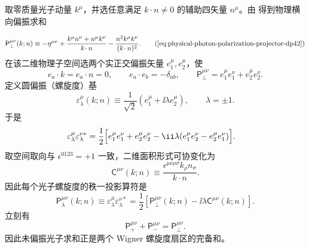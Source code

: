 \begin{derivation}
取零质量光子动量 $k^\mu$，并选任意满足 $k\!\cdot n\neq0$ 的辅助四矢量 $n^\mu$。由 得到物理横向偏振求和

\begin{equation*}
 \mathsf P_\perp^{\mu\nu}(k;n)
 \equiv
 -\eta^{\mu\nu}
 +\frac{k^\mu n^\nu+n^\mu k^\nu}{k\!\cdot n}
 -\frac{n^2k^\mu k^\nu}{(k\!\cdot n)^2}.
 \tag{\cref{eq:physical-photon-polarization-projector-dp42}}
\end{equation*}
在该二维物理子空间选两个实正交偏振矢量 $e_1^\mu,e_2^\mu$，使
\begin{equation*}
 e_a\!\cdot k=e_a\!\cdot n=0,
 \qquad
 e_a\!\cdot e_b=-\delta_{ab},
 \qquad
 \mathsf P_\perp^{\mu\nu}=e_1^\mu e_1^\nu+e_2^\mu e_2^\nu.
\end{equation*}
定义圆偏振（螺旋度）基
\begin{equation*}
 \varepsilon_\lambda^\mu(k;n)
 \equiv\frac1{\sqrt2}
 \left(e_1^\mu+\ii\lambda e_2^\mu\right),
 \qquad \lambda=\pm1.
 \end{equation*}
于是
\begin{align*}
 \varepsilon_\lambda^\mu\varepsilon_\lambda^{\nu *}
 &=\frac12\Bigl[
 e_1^\mu e_1^\nu+e_2^\mu e_2^\nu
 -\ii\lambda(e_1^\mu e_2^\nu-e_2^\mu e_1^\nu)
 \Bigr].
 \end{align*}
取空间取向与 $\epsilon^{0123}=+1$ 一致，二维面积形式可协变化为
\begin{equation*}
 \mathsf C^{\mu\nu}(k;n)
 \equiv
 \frac{\epsilon^{\mu\nu\rho\sigma}k_\rho n_\sigma}
 {k\!\cdot n}.
 \end{equation*}
因此每个光子螺旋度的秩一投影算符是
\begin{equation*}
 {
 \mathsf P_\lambda^{\mu\nu}(k;n)
 \equiv
 \varepsilon_\lambda^\mu\varepsilon_\lambda^{\nu *}
 =\frac12\left[
 \mathsf P_\perp^{\mu\nu}(k;n)
 -\ii\lambda\mathsf C^{\mu\nu}(k;n)
 \right].}
 \end{equation*}
立刻有
\begin{equation*}
 \mathsf P_{+}^{\mu\nu}+\mathsf P_{-}^{\mu\nu}
 =\mathsf P_\perp^{\mu\nu}.
 \end{equation*}
因此未偏振光子求和正是两个 Wigner 螺旋度扇区的完备和。
\end{derivation}

